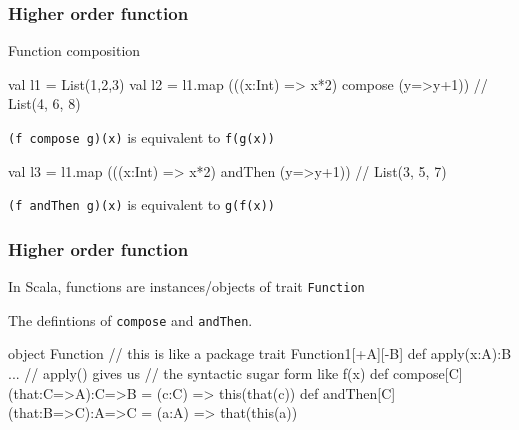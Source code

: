 \documentclass{beamer}
\newcommand{\beb}{\begin{exampleblock}}
\newcommand{\eeb}{\end{exampleblock}}
\begin{document}
\begin{frame}[fragile]
\frametitle{Higher order function}
Function composition
\beb{}
\begin{code}
val l1 = List(1,2,3)
val l2 = l1.map (((x:Int) => x*2) compose (y=>y+1)) 
//  List(4, 6, 8)
\end{code}
\eeb
{\tt (f compose g)(x)} is equivalent to  {\tt f(g(x))}
\beb{}
\begin{code}
val l3 = l1.map (((x:Int) => x*2) andThen (y=>y+1))  
// List(3, 5, 7)
\end{code}
\eeb
{\tt (f andThen g)(x)} is equivalent to  {\tt g(f(x))}

\end{frame}


\begin{frame}[fragile]
\frametitle{Higher order function}
In Scala, functions are instances/objects of trait {\tt Function}
\beb{The defintions of {\tt compose} and {\tt andThen}.}
\begin{code}
object Function { // this is like a package
    trait Function1[+A][-B] {
       def apply(x:A):B {...} 
       // apply() gives us
       // the syntactic sugar form like f(x)
       def compose[C](that:C=>A):C=>B = 
         (c:C) => this(that(c))
       def andThen[C](that:B=>C):A=>C = 
         (a:A) => that(this(a))
    }
}
\end{code}
\eeb

\end{frame}
\end{document}
